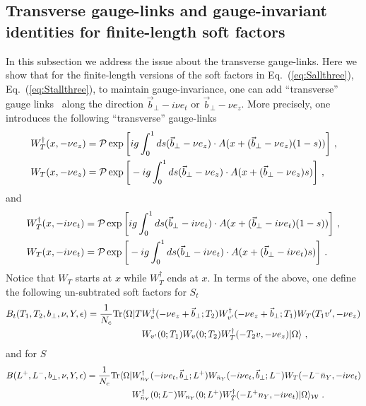 \documentclass[a4paper,11pt]{article}
\begin{document}
\subsection{Transverse gauge-links and gauge-invariant identities for finite-length soft factors}\label{sec:trans}
In this subsection we address the issue about the transverse gauge-links. Here we show that for the finite-length versions of the soft factors in Eq.~(\ref{eq:Sallthree}), Eq.~(\ref{eq:Stallthree}), to maintain gauge-invariance, one can add ``transverse'' gauge links~\cite{Belitsky:2002sm} along the direction $\vec{b}_\perp -i\nu e_t$ or $\vec{b}_\perp -\nu e_z$. More precisely, one introduces the following ``transverse'' gauge-links
\begin{align}
&W_T^{\dagger}(x,-\nu e_z)= {\cal P}\exp\bigg[ig\int_{0}^{1}ds (\vec{b}_\perp-\nu e_z)\cdot A(x+(\vec{b}_\perp-\nu e_z)(1-s))\bigg] \ , \\
&W_T(x,-\nu e_z)={\cal P}\exp\bigg[-ig\int_{0}^{1}ds (\vec{b}_\perp-\nu e_z)\cdot A(x+(\vec{b}_\perp-\nu e_z)s)\bigg] \ ,
\end{align}
and 
\begin{align}
&W_T^{\dagger}(x,-i\nu e_t)= {\cal P}\exp\bigg[ig\int_{0}^{1}ds (\vec{b}_\perp-i\nu e_t)\cdot A(x+(\vec{b}_\perp-i\nu e_t)(1-s))\bigg] \ , \\
&W_T(x,-i\nu e_t)={\cal P}\exp\bigg[-ig\int_{0}^{1}ds (\vec{b}_\perp-i\nu e_t)\cdot A(x+(\vec{b}_\perp-i\nu e_t)s)\bigg] \ .
\end{align}
Notice that $W_T$ starts at $x$ while $W_T^{\dagger}$ ends at $x$. In terms of the above, one define the following un-subtrated soft factors for $S_t$
\begin{align}\label{eq:defBt}
B_t(T_1,T_2,b_\perp,\nu,Y,\epsilon)=\frac{1}{N_c}{\rm Tr}\langle \Omega|T&W^{\dagger}_{v}(-\nu e_z+\vec{b}_\perp;T_2)W^{\dagger}_{v'}(-\nu e_z+\vec{b}_\perp;T_1)W_T(T_1v',-\nu e_z)\nonumber \\ 
&W_{v'}(0;T_1)W_{v}(0;T_2)W_T^{\dagger}(-T_2v,-\nu e_z)|\Omega \rangle \ ,
\end{align}
and for $S$
\begin{align}\label{eq:defB}
B(L^+,L^-,b_\perp,\nu,Y,\epsilon)=\frac{1}{N_c}{\rm Tr}\langle \Omega| &W_{n_Y}^{\dagger}(-i\nu e_t,\vec{b}_\perp;L^+)W_{\bar n_Y}(-i\nu e_t,\vec{b}_\perp;L^-)W_T(-L^-\bar n_Y,-i\nu e_t)
\nonumber \\ & W_{\bar n_Y}^{\dagger}(0;L^-)W_{n_Y}(0;L^+)W_T^{\dagger}(-L^+n_Y,-i\nu e_t)|\Omega\rangle_{\cal W} \ .
\end{align}
\end{document}
